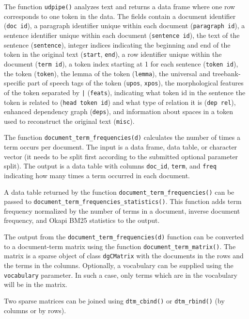 The function \texttt{udpipe()} analyzes text and returns a data frame where one row
corresponds to one token in the data. The fields contain a document identifier (\texttt{doc id}), a paragraph identifier unique within each document (\texttt{paragraph id}),
a sentence identifier unique within each document (\texttt{sentence id}), the text of
the sentence (\texttt{sentence}), integer indices indicating the beginning and end of
the token in the original text (\texttt{start}, \texttt{end}), a row identifier unique
within the document (\texttt{term id}), a token index starting at 1 for each sentence
(\texttt{token id}), the token (\texttt{token}), the lemma of the token (\texttt{lemma}),
the universal and treebank-specific part of speech tags of the token (\texttt{upos}, \texttt{xpos}),
the morphological features of the token separated by \texttt{|} (\texttt{feats}), indicating
what token id in the sentence the token is related to (\texttt{head token id}) and
what type of relation it is (\texttt{dep rel}), enhanced dependency graph (\texttt{deps}),
and information about spaces in a token used to reconstruct the original text (\texttt{misc}).

The function \texttt{document\_term\_frequencies(d)} calculates the number of
times a term occurs per document. The input is a data frame, data table, or character vector (it needs to be split first according to the submitted optional parameter split). The output is a data table with columns \texttt{doc\_id}, \texttt{term}, and \texttt{freq}
indicating how many times a term occurred in each document.

A data table returned by the function \texttt{document\_term\_frequencies()} 
can be passed to \texttt{document\_term\_frequencies\_statistics()}. 
This function adds term frequency normalized by the number of terms in a document, 
inverse document frequency, and Okapi BM25 statistics to the output.

The output from the \texttt{document\_term\_frequencies(d)} function
can be converted to a document-term matrix using the function
\texttt{document\_term\_matrix()}. The matrix is a sparse object of class \texttt{dgCMatrix}
with the documents in the rows and the terms in the columns. Optionally, a vocabulary can be supplied using the \texttt{vocabulary} parameter. In such a case, only
terms which are in the vocabulary will be in the matrix.

Two sparse matrices can be joined using \texttt{dtm\_cbind()} or \texttt{dtm\_rbind()} (by
columns or by rows).

